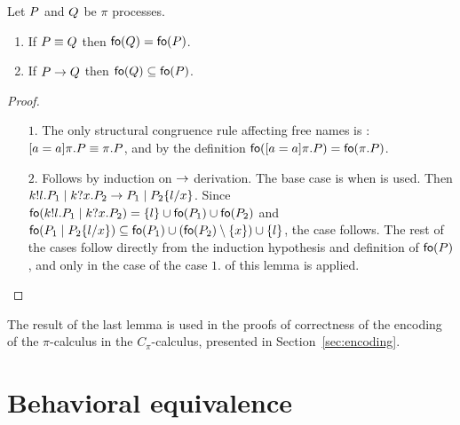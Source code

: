 \begin{lemma}\label{lem:fo_in_equiv_and_red}
Let $P$ and $Q$ be $\pi$ processes. 
\begin{enumerate}
\item If $P\equiv Q$ then $\mathsf{fo}(Q)=\mathsf{fo}(P)$.
\item If $P\rightarrow Q$ then $\mathsf{fo}(Q)\subseteq\mathsf{fo}(P)$.
\end{enumerate} 
\end{lemma}
\begin{proof}
\begin{enumerate}
\item [$\mathit{1}.$] The only structural congruence rule affecting free names is : $[ a = a ]\pi.P\equiv\pi.P$, and by the definition $\mathsf{fo}([ a = a ]\pi.P)=\mathsf{fo}(\pi.P)$.
%
\item [$\mathit{2}.$] Follows by induction on $\rightarrow$ derivation. The base case is when  is used. 
Then $k!l.P_1 \;|\; k?x.P_2 \rightarrow P_1 \;|\; P_2\{l/x\}$. 
Since $\mathsf{fo}(k!l.P_1 \;|\; k?x.P_2)=\{l\}\cup \mathsf{fo}(P_1) \cup \mathsf{fo}(P_2)$ and $\mathsf{fo}(P_1 \;|\; P_2\{l/x\})\subseteq \mathsf{fo}(P_1) \cup (\mathsf{fo}(P_2)\setminus\{x\}) \cup\{l\}$, the case follows. The rest of the cases follow directly from the induction hypothesis and definition of $\mathsf{fo}(P)$, and only in the case of  the case $\mathit{1}$. of this lemma is applied.
\end{enumerate}
\end{proof}

The result of the last lemma is used in the proofs of correctness of the encoding of the $\pi$-calculus in the $C_\pi$-calculus, presented in Section~\ref{sec:encoding}.














\section{Behavioral equivalence} \label{sec:Cpi-bisimilarity}

